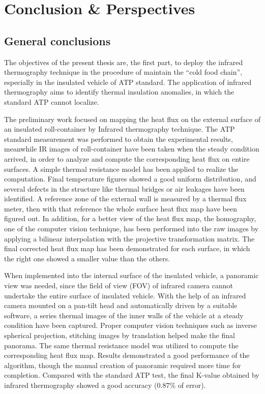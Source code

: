 \chapter{Conclusion \& Perspectives}         %

\section{General conclusions}
The objectives of the present thesis are, the first part, to deploy the infrared thermography technique in the procedure of maintain the ``cold food chain'', especially in the insulated vehicle of ATP standard. The application of infrared thermography aims to identify thermal insulation anomalies, in which the standard ATP cannot localize. 

The preliminary work focused on mapping the heat flux on the external surface of an insulated roll-container by Infrared thermography technique. The ATP standard measurement was performed to obtain the experimental results, meanwhile IR images of roll-container have been taken when the steady condition arrived, in order to analyze and compute the corresponding heat flux on entire surfaces. A simple thermal resistance model has been applied to realize the computation. Final temperature figures showed a good uniform distribution, and several defects in the structure like thermal bridges or air leakages have been identified. A reference zone of the external wall is measured by a thermal flux meter, then with that reference the whole surface heat flux map have been figured out. In addition, for a better view of the heat flux map, the homography, one of the computer vision technique, has been performed into the raw images by applying a bilinear interpolation with the projective transformation matrix. The final corrected heat flux map has been demonstrated for each surface, in which the right one showed a smaller value than the others.

When implemented into the internal surface of the insulated vehicle, a panoramic view was needed, since the field of view (FOV) of infrared camera cannot undertake the entire surface of insulated vehicle. With the help of an infrared camera mounted on a pan-tilt head and automatically driven by a suitable software, a series thermal images of the inner walls of the vehicle at a steady condition have been captured. Proper computer vision techniques such as inverse spherical projection, stitching images by translation helped make the final panorama. The same thermal resistance model was utilized to compute the corresponding heat flux map. Results demonstrated a good performance of the algorithm, though the manual creation of panoramic required more time for completion. Compared with the standard ATP test, the final K-value obtained by infrared thermography showed a good accuracy (0.87\% of error).

